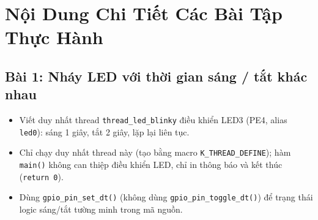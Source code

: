 \newpage
\section{Nội Dung Chi Tiết Các Bài Tập Thực Hành}

\subsection{Bài 1: Nháy LED với thời gian sáng / tắt khác nhau}

\begin{tcolorbox}[
    enhanced,
    colback=black!2,
    colframe=black!60,
    boxrule=1pt,
    arc=2.5mm,
    drop shadow,
    attach boxed title to top left={xshift=4mm, yshift=-3mm},
    boxed title style={
        enhanced,
        colback=black!85,
        colframe=black!85,
        boxrule=1pt,
        arc=2.5mm,
        drop shadow,
        left=6pt, right=6pt, top=2pt, bottom=2pt
    },
    title=\textcolor{white}{\large\textbf{Yêu cầu đề bài (Trích phiếu bài tập)}}
]
\bfseries
\vspace{0.2cm}
\begin{itemize}
    \item Viết duy nhất thread \texttt{thread\_led\_blinky} điều khiển LED3 (PE4, alias \texttt{led0}): sáng 1 giây, tắt 2 giây, lặp lại liên tục.
    \item Chỉ chạy duy nhất thread này (tạo bằng macro \texttt{K\_THREAD\_DEFINE}); hàm \texttt{main()} không can thiệp điều khiển LED, chỉ in thông báo và kết thúc (\texttt{return 0}).
    \item Dùng \texttt{gpio\_pin\_set\_dt()} (không dùng \texttt{gpio\_pin\_toggle\_dt()}) để trạng thái logic sáng/tắt tường minh trong mã nguồn.
\end{itemize}
\end{tcolorbox}

\vspace{0.3cm}
